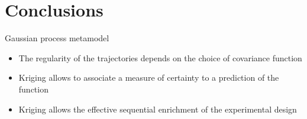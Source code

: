 \documentclass[9pt]{beamer}
\begin{document}
\section{Conclusions}

\begin{frame}{Gaussian process metamodel }

\begin{itemize}
\item The regularity of the trajectories depends on the choice of covariance function
\vspace{0.6cm}
\item Kriging allows to associate a measure of certainty to a prediction of the function
\vspace{0.6cm}
\item Kriging allows the effective sequential enrichment of the experimental design
\end{itemize}

\end{frame}

\footnotesize


\begin{frame}[plain]
		\vskip-3ex
\begin{columns}[t]
	\begin{column}{5.5cm}
  \begin{center}
  \textcolor{orange}{\Huge Thank you}
  \end{center}
  	\end{column}
	\begin{column}{3.2cm}
	  	\end{column}
	  	\end{columns}
\end{frame}
\end{document}
